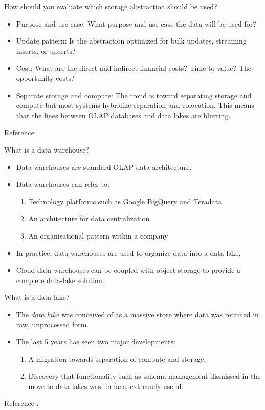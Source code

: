 \begin{questions}
\question How should you evaluate which storage abstraction should be used?
\begin{solution}
\begin{itemize}
    \item Purpose and use case: What purpose and use case the data will be used for?
    \item Update pattern: Is the abstraction optimized for bulk updates, streaming inserts, or upserts?
    \item Cost: What are the direct and indirect financial costs? Time to value? The opportunity costs?
    \item Separate storage and compute: The trend is toward separating storage and compute but most systems hybridize separation and colocation. This means that the lines between OLAP databases and data lakes are blurring.
\end{itemize}
Reference \cite[p.~219]{fode}
\end{solution}

\question What is a data warehouse?
\begin{solution}
\begin{itemize}
\item Data warehouses are standard OLAP data architecture.
\item Data warehouses can refer to: 
\begin{enumerate}
    \item Technology platforms such as Google BigQuery and Teradata
    \item An architecture for data centralization
    \item An organisational pattern within a company
\end{enumerate}
\item In practice, data warehouses are used to organize data into a data lake. 
\item Cloud data warehouses can be coupled with object storage to provide a complete data-lake solution.
\end{itemize}
\end{solution}

\question What is a data lake?

\begin{solution}
\begin{itemize}
\item The \textit{data lake} was conceived of as a massive store where data was retained in raw, unprocessed form.
\item The last 5 years has seen two major developments:
\begin{enumerate}
    \item A migration towards separation of compute and storage.
    \item Discovery that functionality such as schema management dismissed in the move to data lakes was, in face, extremely useful.
\end{enumerate}
\end{itemize}
Reference \cite[p.~220]{fode}.
\end{solution}


\end{questions}
